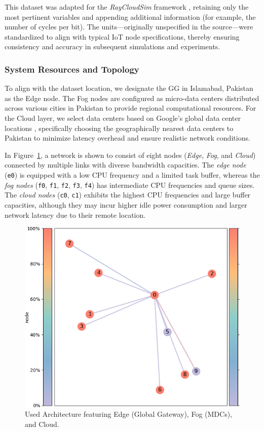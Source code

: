 \documentclass[preprint,12pt]{elsarticle}
\begin{document}
This dataset was adapted for the \emph{RayCloudSim} framework \cite{zhang2022osttd}, retaining only the most pertinent variables and appending additional information (for example, the number of cycles per bit). The units—originally unspecified in the source—were standardized to align with typical IoT node specifications, thereby ensuring consistency and accuracy in subsequent simulations and experiments.

\subsubsection{System Resources and Topology}
\label{subsec:system_resources_topology}

To align with the dataset location, we designate the GG in Islamabad, Pakistan as the Edge node. The Fog nodes are configured as micro-data centers distributed across various cities in Pakistan to provide regional computational resources. For the Cloud layer, we select data centers based on Google's global data center locations \cite{googleDataCenters}, specifically choosing the geographically nearest data centers to Pakistan to minimize latency overhead and ensure realistic network conditions.


In Figure~\ref{fig:used_architecture}, a network is shown to consist of eight nodes (\textit{Edge}, \textit{Fog}, and \textit{Cloud}) connected by multiple links with diverse bandwidth capacities. The \textit{edge node} (\texttt{e0}) is equipped with a low CPU frequency and a limited task buffer, whereas the \textit{fog nodes} (\texttt{f0}, \texttt{f1}, \texttt{f2}, \texttt{f3}, \texttt{f4}) has intermediate CPU frequencies and queue sizes. The \textit{cloud nodes} (\texttt{c0}, \texttt{c1}) exhibits the highest CPU frequencies and large buffer capacities, although they may incur higher idle power consumption and larger network latency due to their remote location.

\begin{figure}[H]
    \centering
    \includegraphics[width=0.75\linewidth]{figs/used_architecture.png}
    \caption{Used Architecture featuring Edge (Global Gateway), Fog (MDCs), and Cloud.}
    \label{fig:used_architecture}
\end{figure}
\end{document}
